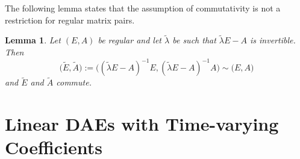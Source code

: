 \documentclass[]{book}
\newtheorem{lemma}{Lemma}[chapter]
\theoremstyle{definition}
\theoremstyle{definition}
\theoremstyle{definition}
\theoremstyle{definition}
\theoremstyle{remark}
\begin{document}
The following lemma states that the assumption of commutativity is not a restriction for regular matrix pairs.

\begin{lemma}
\protect\hypertarget{lem:regular-ea-commute}{}{\label{lem:regular-ea-commute} }Let \((E,A)\) be regular and let \(\tilde \lambda\) be such that \(\tilde \lambda E - A\) is invertible. Then
\[\bigl (\tilde E,\tilde A\bigr ):=\bigl ( (\tilde \lambda E-A)^{-1}E, (\tilde \lambda E-A)^{-1}A \bigr )  \sim \bigl (E,A \bigr )\]
and \(\tilde E\) and \(\tilde A\) commute.
\end{lemma}

\newcommand{\kernel}{\operatorname{kernel}}
\newcommand{\corange}{\operatorname{corange}}
\newcommand{\range}{\operatorname{range}}
\newcommand{\cokernel}{\operatorname{cokernel}}

\hypertarget{linear-daes-with-time-varying-coefficients}{%
\chapter{Linear DAEs with Time-varying Coefficients}\label{linear-daes-with-time-varying-coefficients}}
\end{document}

